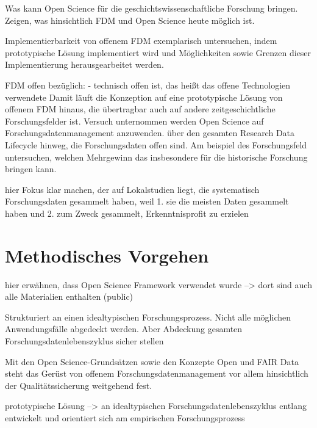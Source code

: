 Was kann Open Science für die geschichtswissenschaftliche Forschung bringen. 
Zeigen, was hinsichtlich FDM und Open Science heute möglich ist.

Implementierbarkeit von offenem FDM exemplarisch untersuchen, indem prototypische Lösung implementiert wird und Möglichkeiten sowie Grenzen dieser Implementierung herausgearbeitet werden.   

FDM offen bezüglich:
- technisch offen ist, das heißt das offene Technologien verwendete
Damit läuft die Konzeption auf eine prototypische Lösung von offenem FDM hinaus, die übertragbar auch auf andere zeitgeschichtliche Forschungsfelder ist.
Versuch unternommen werden Open Science auf Forschungsdatenmanagement anzuwenden. über den gesamten Research Data Lifecycle hinweg, die Forschungsdaten offen sind. Am beispiel des Forschungsfeld untersuchen, welchen Mehrgewinn das insbesondere für die historische Forschung bringen kann. 

 hier Fokus klar machen, der auf Lokalstudien liegt, die systematisch Forschungsdaten gesammelt haben, weil 1. sie die meisten Daten gesammelt haben und 2. zum Zweck gesammelt, Erkenntnisprofit zu erzielen

\section{Methodisches Vorgehen}

hier erwähnen, dass Open Science Framework verwendet wurde --> dort sind auch alle Materialien enthalten (public)

Strukturiert an einen idealtypischen Forschungsprozess. Nicht alle möglichen Anwendungsfälle abgedeckt werden. Aber Abdeckung gesamten Forschungsdatenlebenszyklus sicher stellen

Mit den Open Science-Grundsätzen sowie den Konzepte Open und FAIR Data steht das Gerüst von offenem Forschungsdatenmanagement vor allem hinsichtlich der Qualitätssicherung weitgehend fest.

prototypische Lösung --> an idealtypischen Forschungsdatenlebenszyklus entlang entwickelt und orientiert sich am empirischen Forschungsprozess